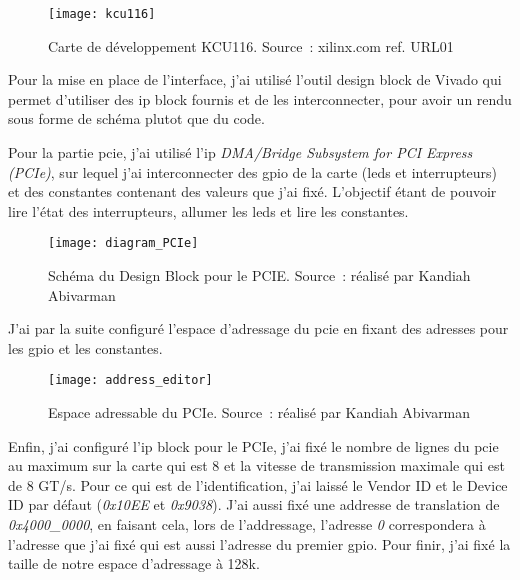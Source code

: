 \begin{figure}[tbph!]
	\centering
	\texttt{[image: kcu116]}
	\caption[Carte de développement KCU116]{Carte de développement KCU116. Source : xilinx.com ref. URL01}
	\label{fig:kcu116}
\end{figure}

Pour la mise en place de l'interface, j'ai utilisé l'outil design block de Vivado qui permet d'utiliser des \gls{ip} block fournis et de les interconnecter, pour avoir un rendu sous forme de schéma plutot que du code.

Pour la partie \gls{pcie}, j'ai utilisé l'\gls{ip} \textit{DMA/Bridge Subsystem for PCI Express (PCIe)}, sur lequel j'ai interconnecter des \gls{gpio} de la carte (leds et interrupteurs) et des constantes contenant des valeurs que j'ai fixé.
L'objectif étant de pouvoir lire l'état des interrupteurs, allumer les leds et lire les constantes.

\newpage

\begin{figure}[tbph!]
	\centering
	\texttt{[image: diagram\_PCIe]}
	\caption[Schéma du Design Block pour le PCIE]{Schéma du Design Block pour le PCIE. Source : réalisé par Kandiah Abivarman}
	\label{fig:diagram_PCIe}
\end{figure}

J'ai par la suite configuré l'espace d'adressage du \gls{pcie} en fixant des adresses pour les \gls{gpio} et les constantes.

\begin{figure}[tbph!]
	\centering
	\texttt{[image: address\_editor]}
	\caption[Espace adressable du PCIe]{Espace adressable du PCIe. Source : réalisé par Kandiah Abivarman}
	\label{fig:address_editor}
\end{figure}

Enfin, j'ai configuré l'\gls{ip} block pour le PCIe, j'ai fixé le nombre de lignes du \gls{pcie} au maximum sur la carte qui est 8 et la vitesse de transmission maximale qui est de 8 GT/s.
Pour ce qui est de l'identification, j'ai laissé le Vendor ID et le Device ID par défaut (\textit{0x10EE} et \textit{0x9038}).
J'ai aussi fixé une addresse de translation de \textit{0x4000\_0000}, en faisant cela, lors de l'addressage, l'adresse \textit{0} correspondera à l'adresse que j'ai fixé qui est aussi l'adresse du premier \gls{gpio}.
Pour finir, j'ai fixé la taille de notre espace d'adressage à 128k.